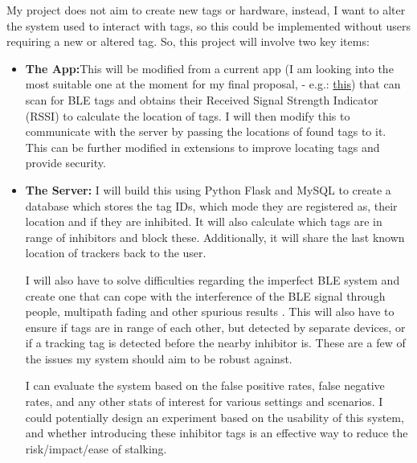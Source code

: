 \documentclass{article}
\begin{document}
My project does not aim to create new tags or hardware, instead, I want to alter the system used to interact with tags, so this could be implemented without users requiring a new or altered tag.
So, this project will involve two key items:
\begin{itemize}
\item{ {\bf The App:}This will be modified from a current app (I am looking into the most suitable one at the moment for my final proposal, - e.g.: \href{https://github.com/neXenio/BLE-Indoor-Positioning}{this}) that can scan for BLE tags and obtains their Received Signal Strength Indicator (RSSI) to calculate the location of tags. I will then modify this to communicate with the server by passing the locations of found tags to it. This can be further modified in extensions to improve locating tags and provide security.}
\item{{\bf The Server:} I will build this using Python Flask and MySQL to create a database which stores the tag IDs, which mode they are registered as, their location and if they are inhibited. It will also calculate which tags are in range of inhibitors and block these. Additionally, it will share the last known location of trackers back to the user.}

I will also have to solve difficulties regarding the imperfect BLE system and create one that can cope with the interference of the BLE signal through people, multipath fading and other spurious results \cite{AccuracyBLE}. This will also have to ensure if tags are in range of each other, but detected by separate devices, or if a tracking tag is detected before the nearby inhibitor is. These are a few of the issues my system should aim to be robust against.

I can evaluate the system based on the false positive rates, false negative rates, and any other stats of interest for various settings and scenarios. I could potentially design an experiment based on the usability of this system, and whether introducing these inhibitor tags is an effective way to reduce the risk/impact/ease of stalking.


\end{itemize}
\end{document}
